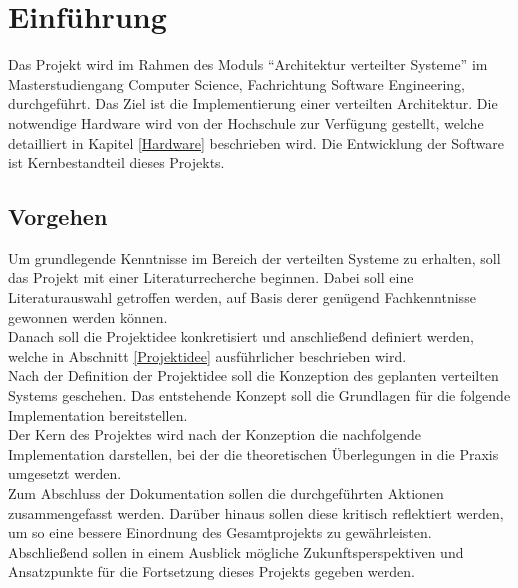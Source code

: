 \chapter{Einführung}
Das Projekt wird im Rahmen des Moduls \enquote{Architektur verteilter Systeme} im Masterstudiengang Computer Science, Fachrichtung Software Engineering, durchgeführt.  Das Ziel ist die Implementierung einer verteilten Architektur. Die notwendige Hardware wird von der Hochschule zur Verfügung gestellt, welche detailliert in Kapitel \ref{Hardware} beschrieben wird.
Die Entwicklung der Software ist Kernbestandteil dieses Projekts. 

 \section{Vorgehen}
Um grundlegende Kenntnisse im Bereich der verteilten Systeme zu erhalten, soll das Projekt mit einer Literaturrecherche beginnen. Dabei soll eine Literaturauswahl getroffen werden, auf Basis derer genügend Fachkenntnisse gewonnen werden können. \\
Danach soll die Projektidee konkretisiert und anschließend definiert werden, welche in Abschnitt \ref{Projektidee} ausführlicher beschrieben wird.\\
Nach der Definition der Projektidee soll die Konzeption des geplanten verteilten Systems geschehen. Das entstehende Konzept soll die Grundlagen für die folgende Implementation bereitstellen. \\
Der Kern des Projektes wird nach der Konzeption die nachfolgende Implementation darstellen, bei der die theoretischen Überlegungen in die Praxis umgesetzt werden. \\
Zum Abschluss der Dokumentation sollen die durchgeführten Aktionen zusammengefasst werden. Darüber hinaus sollen diese kritisch reflektiert werden, um so eine bessere Einordnung des Gesamtprojekts zu gewährleisten. Abschließend sollen in einem Ausblick mögliche Zukunftsperspektiven und Ansatzpunkte für die Fortsetzung dieses Projekts gegeben werden. 

